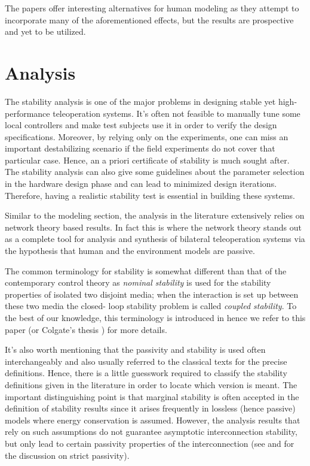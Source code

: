 The papers \cite{leelee,prekopiou} offer interesting alternatives for human modeling as they attempt to incorporate 
many of the aforementioned effects, but the results are prospective and yet to be utilized. 



\section{Analysis}\label{sec:litchapanalysis}

The stability analysis is one of the major problems in designing stable yet high-performance teleoperation 
systems. It's often not feasible to manually tune some local controllers and make test subjects use it in order to verify the
design specifications. Moreover, by relying only on the experiments, one can miss an important destabilizing scenario if the field 
experiments do not cover that particular case. Hence, an a priori certificate of stability is much sought after. The stability 
analysis can also give some guidelines about the parameter selection in the hardware design phase and can lead to minimized 
design iterations. Therefore, having a realistic stability test is essential in building these systems. 

Similar to the modeling section, the analysis in the literature extensively relies on network theory based results. In fact 
this is where the network theory stands out as a complete tool for analysis and synthesis of bilateral teleoperation systems
via the hypothesis that human and the environment models are passive.  

The common terminology for stability is somewhat different than that of the contemporary control theory as \emph{nominal stability} 
is used for the stability properties of isolated two disjoint media; when the interaction is set up between these two media the closed-
loop stability problem is called \emph{coupled stability}. To the best of our knowledge, this terminology is introduced in 
\cite{colgatehogan88} hence we refer to this paper (or Colgate's thesis \cite{colgatephd}) for more details. 


It's also worth mentioning that the passivity and stability is used often interchangeably and also usually referred 
to the classical texts \cite{haykin,mitra69,chen91} for the precise definitions. Hence, there is a little guesswork 
required to classify the stability definitions given in the literature in order to locate which version is meant. 
The important distinguishing point is that marginal stability is often accepted in the definition of stability results 
since it arises frequently in lossless (hence passive) models where energy conservation is assumed. However, the analysis 
results that rely on such assumptions do not guarantee asymptotic interconnection stability, but only lead to certain 
passivity properties of the interconnection (see \cite[Thm. 6.1]{khalil} and \cite[Sec. V]{lawrence} for the discussion 
on strict passivity).  

